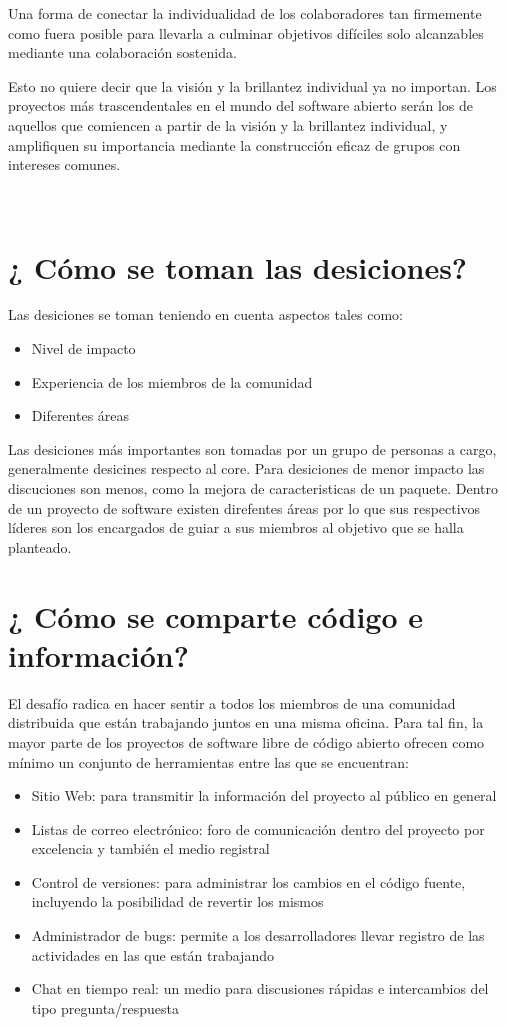 Una forma de conectar la individualidad de los colaboradores tan firmemente como fuera posible para llevarla a culminar objetivos difíciles solo alcanzables mediante una colaboración sostenida. 

Esto no quiere decir que la visión y la brillantez individual ya no importan. Los proyectos más trascendentales en el mundo del software abierto serán los de aquellos que comiencen a partir de la visión y la brillantez individual, y amplifiquen su importancia mediante la construcción eficaz de grupos con intereses comunes. 

\\
\section{¿ Cómo se toman las desiciones?}

Las desiciones se toman teniendo en cuenta aspectos tales como:
\begin{itemize}
     \item Nivel de impacto
     \item Experiencia de los miembros de la comunidad
     \item Diferentes áreas
\end{itemize}

Las desiciones más importantes son tomadas por un grupo de personas a cargo, generalmente desicines respecto al core. Para desiciones de menor impacto las discuciones son menos, como la mejora de caracteristicas de un paquete.
Dentro de un proyecto de software existen direfentes áreas por lo que sus respectivos líderes son los encargados de guiar a sus miembros al objetivo que se halla planteado.



\section{¿ Cómo se comparte código e información?}

El desafío radica en hacer sentir a todos los miembros de una comunidad distribuida que están trabajando juntos en una misma oficina.
Para tal fin, la mayor parte de los proyectos de software libre de código abierto ofrecen como mínimo un conjunto de herramientas entre las que se encuentran: 

\begin{itemize}
     \item Sitio Web: para transmitir la información del proyecto al público en general
     \item Listas de correo electrónico: foro de comunicación dentro del proyecto por excelencia y también el medio registral
     \item Control de versiones: para administrar los cambios en el código fuente, incluyendo la posibilidad de revertir los mismos
     \item Administrador de bugs: permite a los desarrolladores llevar registro de las actividades en las que están trabajando
     \item Chat en tiempo real: un medio para discusiones rápidas e intercambios del tipo pregunta/respuesta
\end{itemize}


